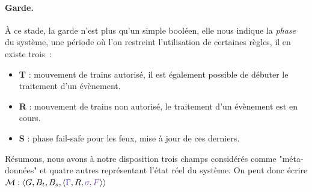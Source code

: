\documentclass[oneside, a4paper, 11pt]{book}
\newcommand{\trainFmt}[1]{{\color{traincolor} #1}}
\newcommand{\swFmt}[1]{{\color{swcolor}{#1}}}
\begin{document}
\paragraph{Garde.} À ce stade, la garde n'est plus qu'un simple booléen, elle nous indique la \textit{phase} du système, une période où l'on restreint l'utilisation de certaines règles, il en existe trois~:

\begin{itemize}
	\item \textbf{T} : mouvement de trains autorisé, il est également possible de débuter le traitement d'un évènement.
	\item \textbf{R} : mouvement de trains non autorisé, le traitement d'un évènement est en cours.
	\item \textbf{S} : phase fail-safe pour les feux, mise à jour de ces derniers.
\end{itemize}

Résumons, nous avons à notre disposition trois champs considérés comme "méta-données" et quatre autres représentant l'état réel du système. On peut donc écrire $\mathcal{M} : \langle G, B_t, B_s, \langle \trainFmt{\Gamma},R,\swFmt{\sigma,F} \rangle \rangle$
\end{document}
